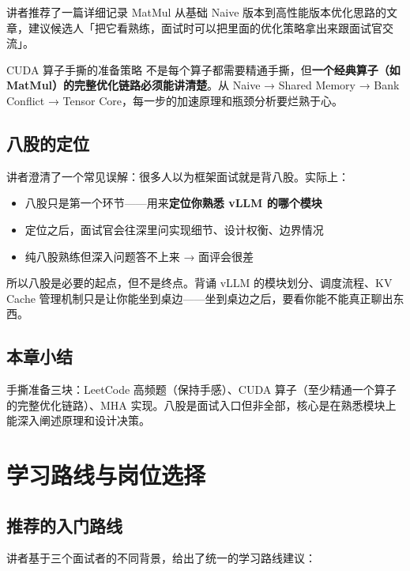 \documentclass[a4paper]{article}
\begin{document}
讲者推荐了一篇详细记录 MatMul 从基础 Naive 版本到高性能版本优化思路的文章，建议候选人「把它看熟练，面试时可以把里面的优化策略拿出来跟面试官交流」。

\begin{knowledgebox}{CUDA 算子手撕的准备策略}
  不是每个算子都需要精通手撕，但\textbf{一个经典算子（如 MatMul）的完整优化链路必须能讲清楚}。从 Naive → Shared Memory → Bank Conflict → Tensor Core，每一步的加速原理和瓶颈分析要烂熟于心。
\end{knowledgebox}

\subsection{八股的定位}

讲者澄清了一个常见误解：很多人以为框架面试就是背八股。实际上：

\begin{itemize}
  \item 八股只是第一个环节——用来\textbf{定位你熟悉 vLLM 的哪个模块}
  \item 定位之后，面试官会往深里问实现细节、设计权衡、边界情况
  \item 纯八股熟练但深入问题答不上来 → 面评会很差
\end{itemize}

所以八股是必要的起点，但不是终点。背诵 vLLM 的模块划分、调度流程、KV Cache 管理机制只是让你能坐到桌边——坐到桌边之后，要看你能不能真正聊出东西。

\subsection{本章小结}

手撕准备三块：LeetCode 高频题（保持手感）、CUDA 算子（至少精通一个算子的完整优化链路）、MHA 实现。八股是面试入口但非全部，核心是在熟悉模块上能深入阐述原理和设计决策。


\section{学习路线与岗位选择}

\subsection{推荐的入门路线}

讲者基于三个面试者的不同背景，给出了统一的学习路线建议：
\end{document}
